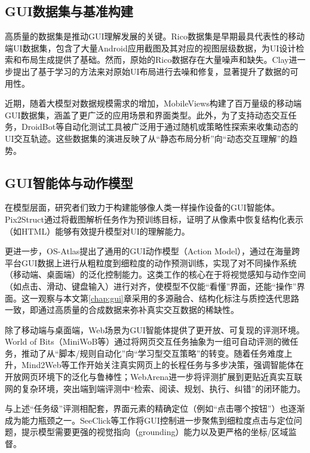 \subsection{GUI数据集与基准构建}
高质量的数据集是推动GUI理解发展的关键。Rico数据集是早期最具代表性的移动端UI数据集，包含了大量Android应用截图及其对应的视图层级数据，为UI设计检索和布局生成提供了基础\citep{deka2017rico}。然而，原始的Rico数据存在大量噪声和缺失。Clay进一步提出了基于学习的方法来对原始UI布局进行去噪和修复，显著提升了数据的可用性\citep{li2022clay}。

近期，随着大模型对数据规模需求的增加，MobileViews构建了百万量级的移动端GUI数据集，涵盖了更广泛的应用场景和界面类型\citep{gao2024mobileviews}。此外，为了支持动态交互任务，DroidBot等自动化测试工具被广泛用于通过随机或策略性探索来收集动态的UI交互轨迹\citep{droidbot}。这些数据集的演进反映了从“静态布局分析”向“动态交互理解”的趋势。

\subsection{GUI智能体与动作模型}
在模型层面，研究者们致力于构建能够像人类一样操作设备的GUI智能体。Pix2Struct通过将截图解析任务作为预训练目标，证明了从像素中恢复结构化表示（如HTML）能够有效提升模型对UI的理解能力\citep{lee2023pix2struct}。

更进一步，OS-Atlas提出了通用的GUI动作模型（Action Model），通过在海量跨平台GUI数据上进行从粗粒度到细粒度的动作预测训练，实现了对不同操作系统（移动端、桌面端）的泛化控制能力\citep{wu2024osatlas}。这类工作的核心在于将视觉感知与动作空间（如点击、滑动、键盘输入）进行对齐，使模型不仅能“看懂”界面，还能“操作”界面。这一观察与本文第\ref{chap:gui}章采用的多源融合、结构化标注与质控迭代思路一致，即通过高质量的合成数据来弥补真实交互数据的稀缺性。

除了移动端与桌面端，Web场景为GUI智能体提供了更开放、可复现的评测环境。World of Bits（MiniWoB等）通过将网页交互任务抽象为一组可自动评测的微任务，推动了从“脚本/规则自动化”向“学习型交互策略”的转变\citep{shi2017worldofbits}。随着任务难度上升，Mind2Web等工作开始关注真实网页上的长程任务与多步决策，强调智能体在开放网页环境下的泛化与鲁棒性\citep{deng2023mind2web}；WebArena进一步将评测扩展到更贴近真实互联网的复杂环境，突出端到端评测中“检索、阅读、规划、执行、纠错”的闭环能力\citep{zhou2023webarena}。

与上述“任务级”评测相配套，界面元素的精确定位（例如“点击哪个按钮”）也逐渐成为能力瓶颈之一。SeeClick等工作将GUI控制进一步聚焦到细粒度点击与定位问题，提示模型需要更强的视觉指向（grounding）能力以及更严格的坐标/区域监督\citep{liu2024seeclick}。

